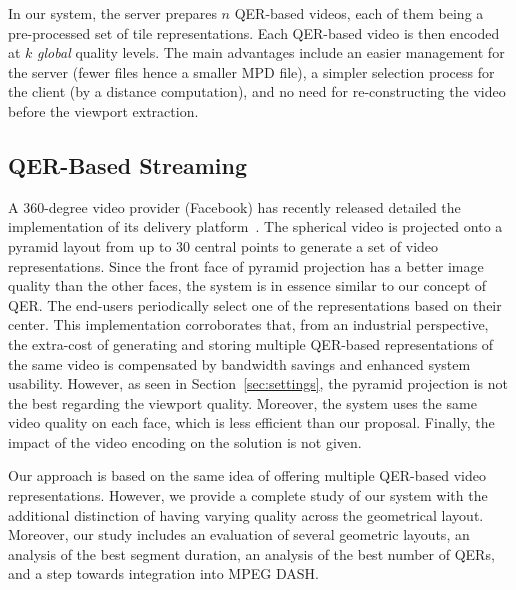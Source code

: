 In our system, the server
prepares $n$ \ac{QER}-based videos, each of them being a
pre-processed set of tile representations. Each \ac{QER}-based video is then
encoded at $k$ \emph{global} quality levels.
The main advantages include
an easier management for the server (fewer files hence a smaller
\ac{MPD} file), a simpler selection process for the client (by a
distance computation), and no need for re-constructing the video before
the viewport extraction.

\subsection{QER-Based Streaming}

A $360$-degree video provider (Facebook) has recently
released detailed the implementation of its delivery
platform~\cite{facebook}.
The spherical video is projected onto a pyramid layout from up to $30$ central
points to generate a set of video representations.
Since the
front face of pyramid projection has a better image quality than the other faces, the
system is in essence similar to our concept of \ac{QER}. The end-users
periodically select one of the representations
based on their \FoV{} center. This implementation
corroborates that, from an industrial perspective, the extra-cost of
generating and storing multiple \ac{QER}-based representations of the
same video is compensated by bandwidth savings and
enhanced system usability.
However, as seen in Section~\ref{sec:settings}, the pyramid projection is not
the best regarding the viewport quality. Moreover, the system
uses the same video quality on each face, which is less
efficient than our proposal. Finally, the impact of the video encoding on the solution
is not given.

Our approach is based on the same
idea of offering multiple \ac{QER}-based video representations.
However, we provide a complete study of our system with the additional
distinction of having varying quality across the geometrical layout. Moreover,
our study includes an evaluation of several
geometric layouts, an analysis of the best segment duration, an
analysis of the best number of \acp{QER},
and a step towards integration into MPEG \ac{DASH}.

